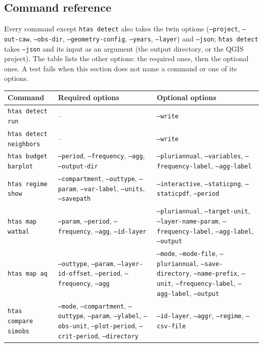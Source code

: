 \documentclass[11pt]{article}
\begin{document}
\subsection{Command reference}\label{sec:cli-reference}

Every command except \texttt{htas detect} also takes the twin options (\texttt{--project}, \texttt{--out-caw}, \texttt{--obs-dir}, \texttt{--geometry-config}, \texttt{--years}, \texttt{--layer}) and \texttt{--json}; \texttt{htas detect} takes \texttt{--json} and its input as an argument (the output directory, or the QGIS project). The table lists the other options: the required ones, then the optional ones. A test fails when this section does not name a command or one of its options.

\begin{center}
\small
\begin{tabularx}{\textwidth}{>{\raggedright\arraybackslash}l >{\raggedright\arraybackslash}X >{\raggedright\arraybackslash}X}
\toprule
\textbf{Command} & \textbf{Required options} & \textbf{Optional options} \\
\midrule
\texttt{htas detect run} & -- & \texttt{--write} \\
\texttt{htas detect neighbors} & -- & \texttt{--write} \\
\texttt{htas budget barplot} & \texttt{--period}, \texttt{--frequency}, \texttt{--agg}, \texttt{--output-dir} & \texttt{--pluriannual}, \texttt{--variables}, \texttt{--frequency-label}, \texttt{--agg-label} \\
\texttt{htas regime show} & \texttt{--compartment}, \texttt{--outtype}, \texttt{--param}, \texttt{--var-label}, \texttt{--units}, \texttt{--savepath} & \texttt{--interactive}, \texttt{--staticpng}, \texttt{--staticpdf}, \texttt{--period} \\
\texttt{htas map watbal} & \texttt{--param}, \texttt{--period}, \texttt{--frequency}, \texttt{--agg}, \texttt{--id-layer} & \texttt{--pluriannual}, \texttt{--target-unit}, \texttt{--layer-name-param}, \texttt{--frequency-label}, \texttt{--agg-label}, \texttt{--output} \\
\texttt{htas map aq} & \texttt{--outtype}, \texttt{--param}, \texttt{--layer-id-offset}, \texttt{--period}, \texttt{--frequency}, \texttt{--agg} & \texttt{--mode}, \texttt{--mode-file}, \texttt{--pluriannual}, \texttt{--save-directory}, \texttt{--name-prefix}, \texttt{--unit}, \texttt{--frequency-label}, \texttt{--agg-label}, \texttt{--output} \\
\texttt{htas compare simobs} & \texttt{--mode}, \texttt{--compartment}, \texttt{--outtype}, \texttt{--param}, \texttt{--ylabel}, \texttt{--obs-unit}, \texttt{--plot-period}, \texttt{--crit-period}, \texttt{--directory} & \texttt{--id-layer}, \texttt{--aggr}, \texttt{--regime}, \texttt{--csv-file} \\

\end{tabularx}
\end{center}
\end{document}
